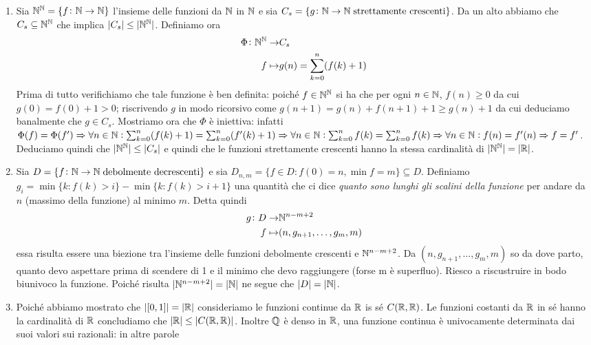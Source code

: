 \begin{enumerate}
\item Sia $ \mathbb{N}^{\mathbb{N}} = \{f \colon \mathbb{N} \to \mathbb{N}\} $ l'insieme delle funzioni da $ \mathbb{N} $ in $ \mathbb{N} $ e sia $ C_s = \{g \colon \mathbb{N} \to \mathbb{N} \; \text{strettamente crescenti}\} $. Da un alto abbiamo che $ C_s \subseteq \mathbb{N}^{\mathbb{N}} $ che implica $ |C_s| \leq |\mathbb{N}^{\mathbb{N}}| $. Definiamo ora
  \begin{align*}
    \Phi \colon \mathbb{N}^{\mathbb{N}} \to & C_s \\
    f \mapsto & g(n) = \sum_{k = 0}^{n} (f(k) + 1)
  \end{align*}
  Prima di tutto verifichiamo che tale funzione è ben definita: poiché $ f \in \mathbb{N}^{\mathbb{N}} $ si ha che per ogni $ n \in \mathbb{N} $, $ f(n) \geq 0 $ da cui $ g(0) = f(0) + 1 > 0 $; riscrivendo $ g $ in modo ricorsivo come $ g(n + 1) = g(n) + f(n + 1) + 1 \geq g(n) + 1 $ da cui deduciamo banalmente che $ g \in C_s $. Mostriamo ora che $ \Phi $ è iniettiva: infatti $ \Phi(f) = \Phi(f') \Rightarrow \forall n \in \mathbb{N} :  \sum_{k = 0}^{n} (f(k) + 1) = \sum_{k = 0}^{n} (f'(k) + 1) \Rightarrow \forall n \in \mathbb{N} : \sum_{k = 0}^{n} f(k) = \sum_{k = 0}^{n} f(k) \Rightarrow \forall n \in \mathbb{N} : f(n) = f'(n) \Rightarrow f = f' $. Deduciamo quindi che $ |\mathbb{N}^{\mathbb{N}}| \leq |C_s| $ e quindi che le funzioni strettamente crescenti hanno la stessa cardinalità di $ |\mathbb{N}^{\mathbb{N}}| = |\mathbb{R}| $.
\item Sia $ D = \{f \colon \mathbb{N} \to \mathbb{N} \; \text{debolmente decrescenti}\} $ e sia $ D_{n, m} = \{f \in D : f(0) = n, \min f = m\} \subseteq D $. Definiamo $ g_i = \min\{k : f(k) > i\} - \min\{k : f(k) > i + 1\} $ una quantità che ci dice \emph{quanto sono lunghi gli scalini della funzione} per andare da $ n $ (massimo della funzione) al minimo $ m $. Detta quindi
  \begin{align*}
    g \colon D \to & \mathbb{N}^{n - m + 2} \\
    f \mapsto & (n, g_{n + 1}, \dots, g_{m}, m)
  \end{align*}
  essa risulta essere una biezione tra l'insieme delle funzioni debolmente crescenti e $ \mathbb{N}^{n - m + 2} $. \textsf{Da $ (n, g_{n + 1}, \dots, g_{m}, m) $ so da dove parto, quanto devo aspettare prima di scendere di 1 e il minimo che devo raggiungere (forse m è superfluo). Riesco a riscustruire in bodo biunivoco la funzione.} Poiché risulta $ |\mathbb{N}^{n - m + 2}| = |\mathbb{N}| $ ne segue che $ |D| = |\mathbb{N}| $.
\item Poiché abbiamo mostrato che $ |[0, 1]| = |\mathbb{R}| $ consideriamo le funzioni continue da $ \mathbb{R} $ is sé $ C(\mathbb{R}, \mathbb{R}) $. Le funzioni costanti da $ \mathbb{R} $ in sé hanno la cardinalità di $ \mathbb{R} $ concludiamo che $ |\mathbb{R}| \leq |C(\mathbb{R}, \mathbb{R})| $. Inoltre $ \mathbb{Q} $ è denso in $ \mathbb{R} $, una funzione continua è univocamente determinata dai suoi valori sui razionali: in altre parole

\end{enumerate}
